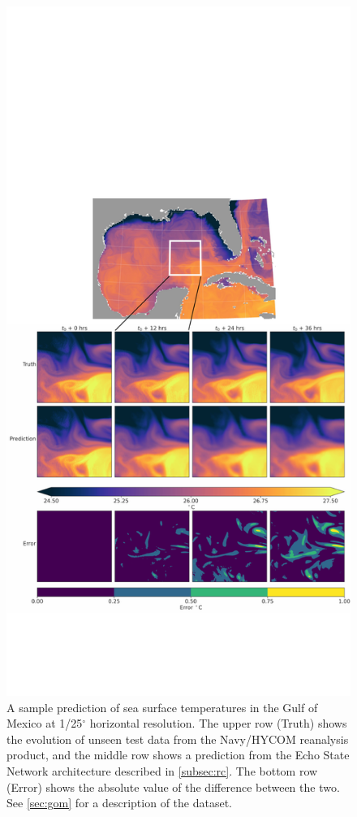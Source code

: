 \begin{figure}
    \centering
    \includegraphics[width=.8\textwidth]{../figures/rc_gom_sst.pdf}
    \caption{A sample prediction of sea surface temperatures in the Gulf of Mexico at 1/25$^\circ$
        horizontal resolution.
        The upper row (Truth) shows the evolution of unseen test data from the
        Navy/HYCOM reanalysis product, and the middle row shows a prediction
        from the Echo State Network architecture described in
        \cref{subsec:rc}.
        The bottom row (Error) shows the absolute value of the difference between the two.
        See \cref{sec:gom} for a description of the dataset.
    }
    \label{fig:gom_sst}
\end{figure}


